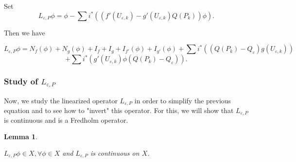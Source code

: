\documentclass[12pt]{amsart}
\theoremstyle{plain}
\newtheorem{lemma}[theorem]{Lemma}       %
\theoremstyle{definition}
\theoremstyle{remark}
\renewcommand{\epsilon}{\varepsilon}
\begin{document}
$$$$
Set
$$L_{\epsilon,P}\phi = \phi - \sum i^*((f'(U_{\epsilon,k})-g'(U_{\epsilon,k})Q(P_k))\phi).$$



\noindent Then we have 

$$L_{\epsilon,P}\phi = N_f(\phi) + N_g(\phi)  + I_f + I_g + I_{f'}(\phi) + I_{g'}(\phi)+\sum i^*((Q(P_k)-Q_{\epsilon})g(U_{\epsilon,k})) $$$$+ \sum i^*(g'(U_{\epsilon,k})\phi(Q(P_k)-Q_{\epsilon})). $$

 



 


\subsubsection{Study of $L_{\epsilon,P}$}
Now, we study the linearized operator $L_{\epsilon,P}$ in order to simplify the previous equation and to see how to "invert" this operator. For this, we will show that $L_{\epsilon,P}$ is continuous and is a Fredholm operator.   
  

 
\begin{lemma}\label{continuity 1}

$L_{\epsilon,P}\phi \in X, \forall \phi \in X$ and $L_{\epsilon,P}$ is continuous on $X$.
\end{lemma}
\end{document}
